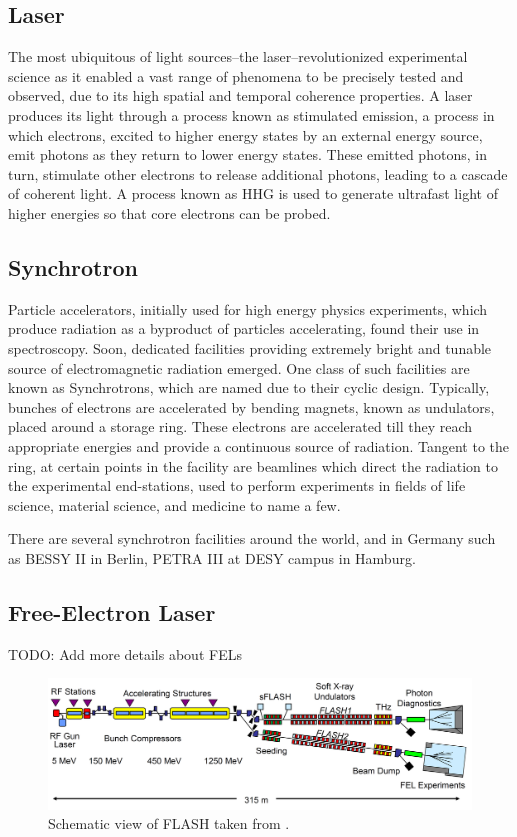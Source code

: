 \subsection{Laser}
The most ubiquitous of light sources--the laser--revolutionized experimental science as it enabled a vast range of phenomena to be precisely tested and observed, due to its high spatial and temporal coherence properties. A laser produces its light through a process known as stimulated emission, a process in which electrons, excited to higher energy states by an external energy source, emit photons as they return to lower energy states. These emitted photons, in turn, stimulate other electrons to release additional photons, leading to a cascade of coherent light. A process known as \gls{HHG} is used to generate ultrafast light of higher energies so that core electrons can be probed.  

\subsection{Synchrotron}
Particle accelerators, initially used for high energy physics experiments, which produce radiation as a byproduct of particles accelerating, found their use in spectroscopy. Soon, dedicated facilities providing extremely bright and tunable source of electromagnetic radiation emerged. One class of such facilities are known as Synchrotrons, which are named due to their cyclic design. Typically, bunches of electrons are accelerated by bending magnets, known as \glspl{undulator}, placed around a storage ring. These electrons are accelerated till they reach appropriate energies and provide a continuous source of radiation. Tangent to the ring, at certain points in the facility are beamlines which direct the radiation to the experimental end-stations, used to perform experiments in fields of life science, material science, and medicine to name a few.

There are several synchrotron facilities around the world, and in Germany such as BESSY II in Berlin, PETRA III at DESY campus in Hamburg.

\subsection{Free-Electron Laser}
TODO: Add more details about FELs
\begin{figure}
    \includegraphics[width=1\linewidth]{images/flash_fel.png}
    \caption{Schematic view of \gls{FLASH} taken from \cite{faatzSimultaneousOperationTwo2016}.}
\end{figure}

